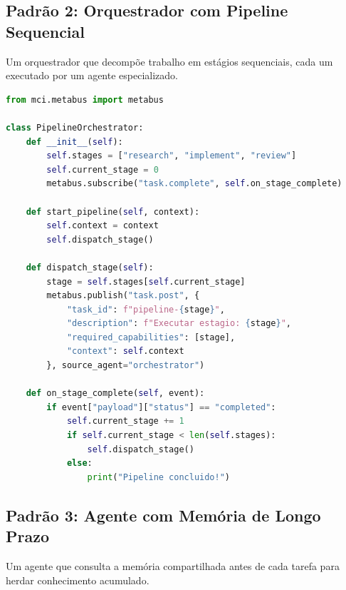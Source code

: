 \subsection{Padrão 2: Orquestrador com Pipeline Sequencial}

Um orquestrador que decompõe trabalho em estágios sequenciais, cada um executado por um agente especializado.

\begin{lstlisting}[language=Python, caption={Orquestrador com pipeline sequencial}, label={lst:orchestrator}]
from mci.metabus import metabus

class PipelineOrchestrator:
    def __init__(self):
        self.stages = ["research", "implement", "review"]
        self.current_stage = 0
        metabus.subscribe("task.complete", self.on_stage_complete)
    
    def start_pipeline(self, context):
        self.context = context
        self.dispatch_stage()
    
    def dispatch_stage(self):
        stage = self.stages[self.current_stage]
        metabus.publish("task.post", {
            "task_id": f"pipeline-{stage}",
            "description": f"Executar estagio: {stage}",
            "required_capabilities": [stage],
            "context": self.context
        }, source_agent="orchestrator")
    
    def on_stage_complete(self, event):
        if event["payload"]["status"] == "completed":
            self.current_stage += 1
            if self.current_stage < len(self.stages):
                self.dispatch_stage()
            else:
                print("Pipeline concluido!")
\end{lstlisting}

\subsection{Padrão 3: Agente com Memória de Longo Prazo}

Um agente que consulta a memória compartilhada antes de cada tarefa para herdar conhecimento acumulado.


